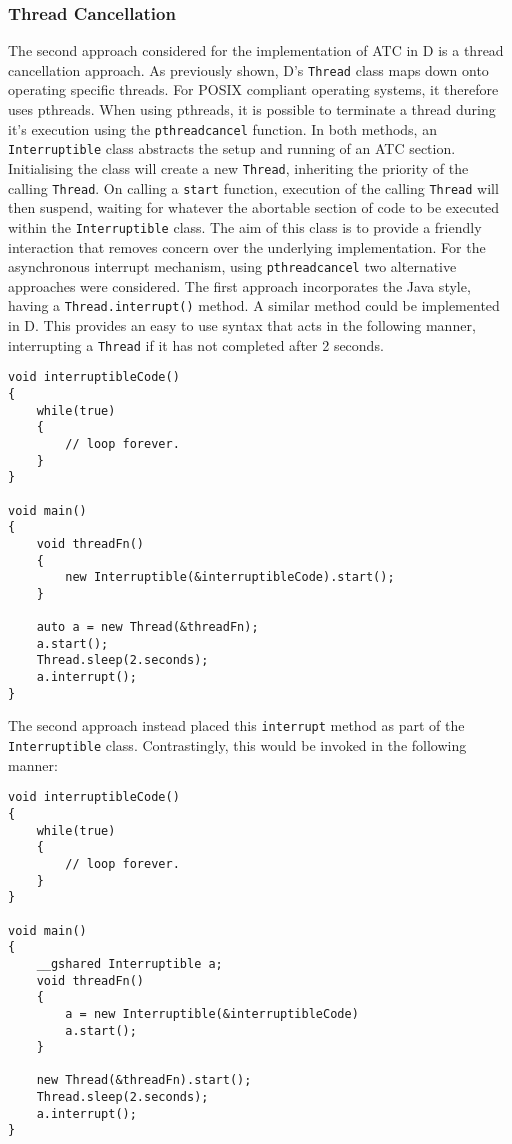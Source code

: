 \subsubsection*{Thread Cancellation}
The second approach considered for the implementation of ATC in D is a thread 
cancellation approach. As previously shown, D's \texttt{Thread} class maps down onto 
operating specific threads. For POSIX compliant operating systems, it therefore 
uses pthreads. When using pthreads, it is possible to terminate a thread during 
it's execution using the \texttt{pthread\textunderscore{}cancel} function. 
In both methods, an \texttt{Interruptible} class abstracts the setup and running of an 
ATC section. 
Initialising the class will create a new \texttt{Thread}, 
inheriting the priority of the calling \texttt{Thread}. 
On calling a \texttt{start} function, execution of the calling 
\texttt{Thread} will then suspend, waiting for whatever the abortable section 
of code to be executed within the \texttt{Interruptible} class.
The aim of this class is to provide a friendly interaction 
that removes concern over the underlying implementation. 
For the asynchronous interrupt mechanism, using \texttt{pthread\textunderscore{}cancel} 
two alternative approaches were considered.
The first approach incorporates the Java style, having a 
\texttt{Thread.interrupt()} method. A similar method could be implemented in D. 
This provides an easy to use syntax that acts in the following manner, 
interrupting a \texttt{Thread} if it has not completed after 2 seconds.
\begin{lstlisting}
void interruptibleCode()
{
    while(true)
    {
        // loop forever.
    }
}

void main()
{
    void threadFn()
    {
        new Interruptible(&interruptibleCode).start(); 
    }

    auto a = new Thread(&threadFn); 
    a.start(); 
    Thread.sleep(2.seconds); 
    a.interrupt();
}
\end{lstlisting}
The second approach instead placed this \texttt{interrupt} method as part of the 
\texttt{Interruptible} class. Contrastingly, this would be invoked in the following
manner: 
\begin{lstlisting}
void interruptibleCode()
{
    while(true)
    {
        // loop forever.
    }
}

void main()
{
    __gshared Interruptible a; 
    void threadFn()
    {
        a = new Interruptible(&interruptibleCode)
        a.start(); 
    }

    new Thread(&threadFn).start(); 
    Thread.sleep(2.seconds); 
    a.interrupt();
}
\end{lstlisting}
